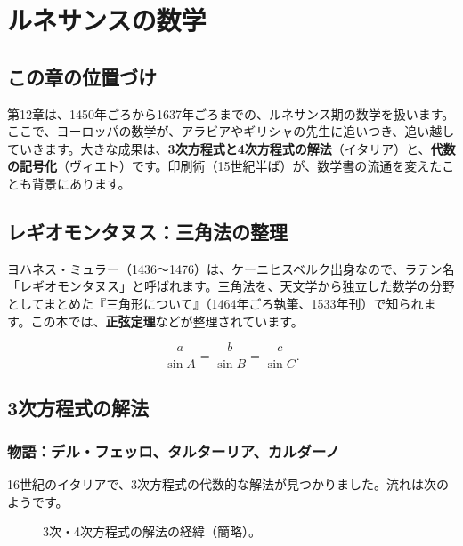 \documentclass[a4paper,11pt,openany]{ltjsbook}
\begin{document}
\chapter{ルネサンスの数学}

\section{この章の位置づけ}

第12章は、1450年ごろから1637年ごろまでの、ルネサンス期の数学を扱います。ここで、ヨーロッパの数学が、アラビアやギリシャの先生に追いつき、追い越していきます。大きな成果は、\textbf{3次方程式と4次方程式の解法}（イタリア）と、\textbf{代数の記号化}（ヴィエト）です。印刷術（15世紀半ば）が、数学書の流通を変えたことも背景にあります。

\section{レギオモンタヌス：三角法の整理}

ヨハネス・ミュラー（1436〜1476）は、ケーニヒスベルク出身なので、ラテン名「レギオモンタヌス」と呼ばれます。三角法を、天文学から独立した数学の分野としてまとめた『三角形について』（1464年ごろ執筆、1533年刊）で知られます。この本では、\textbf{正弦定理}などが整理されています。

\[
\frac{a}{\sin A}=\frac{b}{\sin B}=\frac{c}{\sin C}.
\]

\section{3次方程式の解法}

\subsection{物語：デル・フェッロ、タルターリア、カルダーノ}

16世紀のイタリアで、3次方程式の代数的な解法が見つかりました。流れは次のようです。

\begin{figure}[htbp]
\centering
{}
\caption{3次・4次方程式の解法の経緯（簡略）。}
\end{figure}
\end{document}
